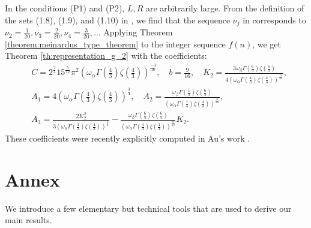 \documentclass[a4paper]{amsart}
\theoremstyle{remark}
\theoremstyle{definition}
\begin{document}
In the conditions (P1) and (P2), $L,R$ are arbitrarily large. From the definition of the sets (1.8), (1.9), and (1.10) in \cite{bridges2024asymptotic}, we find that the sequence $\nu_j$ in \cite[Theorem 4.4]{bridges2024asymptotic} corresponds to $\nu_2=\frac{1}{20}, \nu_3=\frac{2}{20}, \nu_4=\frac{3}{20}, \ldots $ Applying Theorem \ref{theorem:meinardus_type_theorem} to the integer sequence $f(n)$, we get Theorem \ref{th:representation_g_2} with the coefficients:
\begin{align*}
    &C = 2^{\frac{7}{4}} 15^{\frac{5}{12}} \pi^2 \left( \omega_{\alpha}\Gamma\left( \frac{4}{3} \right)\zeta\left( \frac{4}{3} \right)\right)^{\frac{-3}{16}}, \quad b=\frac{9}{16}, \quad K_2 = \frac{3\omega_{\beta} \Gamma\left( \frac{6}{5} \right) \zeta\left( \frac{6}{5} \right)}{4\left( \omega_{\alpha} \Gamma\left( \frac{4}{3} \right) \zeta\left( \frac{4}{3} \right)\right)^{\frac{3}{20}}}, \\
    &A_1 = 4\left( \omega_{\alpha}\Gamma\left( \frac{4}{3} \right)\zeta\left( \frac{4}{3} \right)\right)^{\frac{3}{4}}, \quad A_2 = \frac{\omega_{\beta} \Gamma\left( \frac{1}{5} \right) \zeta\left( \frac{6}{5} \right)}{\left( \omega_\alpha \Gamma\left( \frac{1}{3} \right)\zeta\left( \frac{4}{3}\right) \right)^{\frac{3}{20}}}, \\
    &A_3 = \frac{2K_2^{2}}{3\left( \omega_{\alpha} \Gamma\left( \frac{4}{3} \right) \zeta\left( \frac{4}{3} \right)\right)^{\frac{3}{4}}} - \frac{\omega_{\beta} \Gamma\left( \frac{6}{5} \right) \zeta\left( \frac{6}{5} \right)}{\left( \omega_{\alpha} \Gamma\left( \frac{4}{3} \right) \zeta\left( \frac{4}{3} \right)\right)^{\frac{9}{10}}} K_2.
\end{align*}
These coefficients were recently explicitly computed in Au's work \cite[Example 10.4]{au2025valueswitten}.

\section{Annex}
\label{section:annex}

We introduce a few elementary but technical tools that are used to derive our main results.
\end{document}
